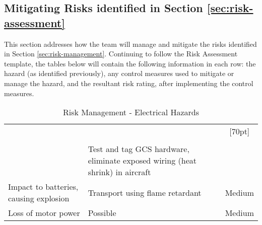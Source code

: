 \label{sec:risk-management}
\subsection{Mitigating Risks identified in Section \ref{sec:risk-assessment}}
This section addresses how the team will manage and mitigate the risks identified in Section \ref{sec:risk-management}. Continuing to follow the Risk Assessment template, the tables below will contain the following information in each row: the hazard (as identified previously), any control measures used to mitigate or manage the hazard, and the resultant risk rating, after implementing the control measures.\\

\begin{table}[!ht]
	\label{tab:management-electrical}
	\centering
	\begin{tabularx}{\textwidth}{|Y|Y|c|}
		\hline		
		 &  & \\
		& & \\
		\hline
		 & Test and tag GCS hardware, eliminate exposed wiring (heat shrink) in aircraft & \\
		\hline
		Impact to batteries, causing explosion & Transport using flame retardant  & Medium\\
		\hline
		Loss of motor power & Possible & Medium\\		
		\hline
	\end{tabularx} 
	\caption{Risk Management - Electrical Hazards}
\end{table}

